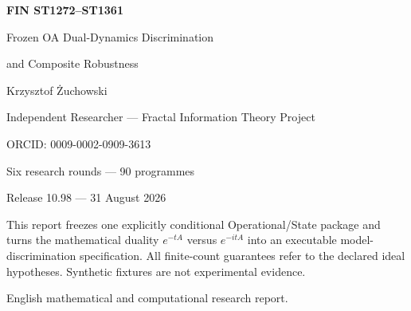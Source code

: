 \documentclass[11pt,a4paper]{article}
\begin{document}
\begin{titlepage}\centering\vspace*{15mm}
{\Huge\bfseries FIN ST1272--ST1361\par}\vspace{5mm}
{\LARGE Frozen OA Dual-Dynamics Discrimination\par}\vspace{2mm}
{\LARGE and Composite Robustness\par}\vspace{13mm}
{\Large Krzysztof \.Zuchowski\par}
{\normalsize Independent Researcher --- Fractal Information Theory Project\par}
{\normalsize ORCID: 0009-0002-0909-3613\par}\vspace{10mm}
{\large Six research rounds --- 90 programmes\par}
{\large Release 10.98 --- 31 August 2026\par}
\vfill
\begin{minipage}{.87\textwidth}\small
This report freezes one explicitly conditional Operational/State package and
turns the mathematical duality $e^{-tA}$ versus $e^{-itA}$ into an executable
model-discrimination specification.  All finite-count guarantees refer to the
declared ideal hypotheses.  Synthetic fixtures are not experimental evidence.
\end{minipage}\vfill
{\small English mathematical and computational research report.}
\end{titlepage}
\end{document}
